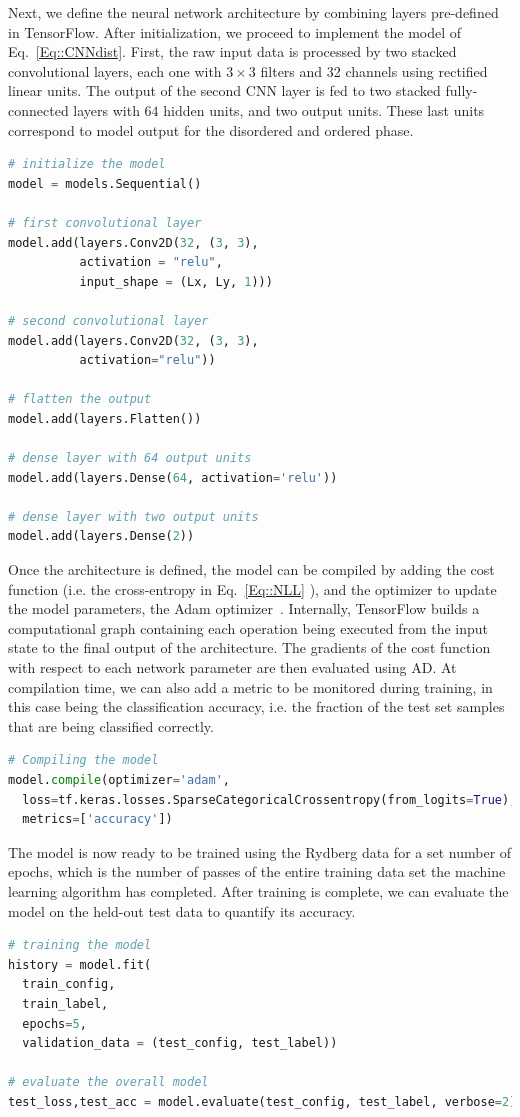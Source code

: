 \documentclass[twocolumn,english,reprint,superscriptaddress,longbibliography,pra]{revtex4-1}
\begin{document}
Next, we define the neural network architecture by combining layers pre-defined in TensorFlow. After initialization, we proceed to implement the model of Eq.~\ref{Eq::CNNdist}. First,  the raw input data is processed by two stacked convolutional layers, each one with $3\times3$ filters and 32 channels using rectified linear units. The output of the second CNN layer is fed to two stacked fully-connected layers with $64$ hidden units, and two output units. These last units correspond to model output for the disordered and ordered phase. 
\begin{lstlisting}[language=Python,numbers=none]
# initialize the model
model = models.Sequential()

# first convolutional layer
model.add(layers.Conv2D(32, (3, 3),
          activation = "relu", 
          input_shape = (Lx, Ly, 1)))
          
# second convolutional layer
model.add(layers.Conv2D(32, (3, 3), 
          activation="relu"))

# flatten the output
model.add(layers.Flatten())

# dense layer with 64 output units
model.add(layers.Dense(64, activation='relu'))

# dense layer with two output units
model.add(layers.Dense(2))
\end{lstlisting}

Once the architecture is defined, the model can be compiled by adding the cost function (i.e. the cross-entropy in Eq.~\ref{Eq::NLL} ), and the optimizer to update the model parameters, the Adam optimizer~\cite{2014arXiv1412.6980K}. Internally, TensorFlow builds a computational graph containing each operation being executed from the input state to the final output of the architecture. The gradients of the cost function with respect to each network parameter are then evaluated using AD. At compilation time, we can also add a metric to be monitored during training, in this case being the classification accuracy, i.e. the fraction of the test set samples that are being classified correctly.
\begin{lstlisting}[language=Python,numbers=none]
# Compiling the model
model.compile(optimizer='adam', 
  loss=tf.keras.losses.SparseCategoricalCrossentropy(from_logits=True), 
  metrics=['accuracy'])
\end{lstlisting}

The model is now ready to be trained using the Rydberg data for a set number of epochs, which is the number of passes of the entire training data set the machine learning algorithm has completed. After training is complete, we can evaluate the model on the held-out test data to quantify its accuracy.
\begin{lstlisting}[language=Python,numbers=none]
# training the model
history = model.fit(
  train_config, 
  train_label, 
  epochs=5, 
  validation_data = (test_config, test_label))

# evaluate the overall model
test_loss,test_acc = model.evaluate(test_config, test_label, verbose=2)
\end{lstlisting}
\end{document}
